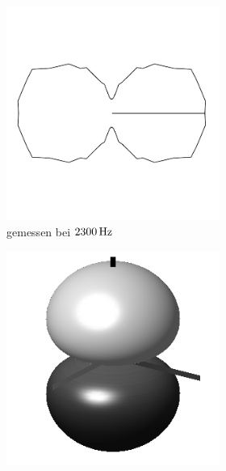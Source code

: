 \documentclass[numbers=noenddot,12pt,a4paper]{scrartcl}
\begin{document}
\begin{figure}[H]
\centering
	\begin{subfigure}[h]{0.3\textwidth}
	\begin{subfigure}[b]{\textwidth}
		\includegraphics[angle=90,origin=c,width=\textwidth]{messwerte/polarl1.pdf}
		\caption{gemessen bei $\unit[2300]{Hz}$} \label{img:l1}
	\end{subfigure}
	\begin{subfigure}[b]{\textwidth}
		\includegraphics[width=\textwidth]{Spherical_Harmonics_deg3l1m0.png}

\end{subfigure}
\end{subfigure}
\end{figure}
\end{document}
